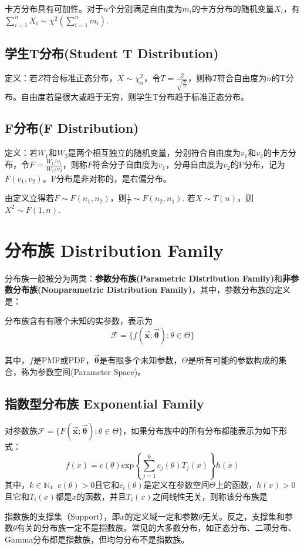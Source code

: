 \documentclass[UTF8]{ctexbook}
\begin{document}
卡方分布具有可加性。对于$n$个分别满足自由度为$m_i$的卡方分布的随机变量$X_i$，有$\sum_{i=1}^nX_i\sim\chi^2(\sum_{i=1}^nm_i)$.
\subsection{学生T分布(Student T Distribution)}
\label{t definition}
定义：若$Z$符合标准正态分布，$X\sim \chi_n^2$，令$T=\frac{Z}{\sqrt{\frac{X}{n}}}$，则称$T$符合自由度为$n$的T分布。自由度若是很大或趋于无穷，则学生T分布趋于标准正态分布。
\subsection{F分布(F Distribution)}
定义：若$W_1$和$W_2$是两个相互独立的随机变量，分别符合自由度为$v_1$和$v_2$的卡方分布，令$F=\frac{W_1/v_1}{W_2/v_2}$，则称$F$符合分子自由度为$v_1$，分母自由度为$v_2$的F分布，记为$F(v_1,v_2)$。F分布是非对称的，是右偏分布。

由定义立得若$F\sim F(n_1,n_2)$，则$\frac{1}{F}\sim F(n_2,n_1)$. 若$X\sim T(n)$，则$X^2\sim F(1,n)$.
\section{分布族 Distribution Family}
分布族一般被分为两类：\textbf{参数分布族(Parametric Distribution Family)}和\textbf{非参数分布族(Nonparametric Distribution Family)}，其中，参数分布族的定义是：

分布族含有有限个未知的实参数，表示为
\[
	\mathcal{F}=\{f(\vec{\boldsymbol x};\vec{\boldsymbol\theta}):\theta\in\Theta\}
\]

其中，$f$是PMF或PDF，$\vec{\boldsymbol\theta}$是有限多个未知参数，$\Theta$是所有可能的参数构成的集合，称为参数空间(Parameter Space)。
\subsection{指数型分布族 Exponential Family}
对参数族$\mathcal{F}=\{F(\vec{\boldsymbol x};\vec{\boldsymbol\theta}):\theta\in\Theta\}$，如果分布族中的所有分布都能表示为如下形式：
\[
	f(x)=c(\theta)\text{exp}\left\{\sum_{j=1}^kc_j(\theta)T_j(x)\right\}h(x)
\]
其中，$k\in\mathbb{N}$，$c(\theta)>0$且它和$c_i(\theta)$是定义在参数空间$\Theta$上的函数，$h(x)>0$且它和$T_i(x)$都是$x$的函数，并且$T_i(x)$之间线性无关，则称该分布族是

指数族的支撑集（Support），即$x$的定义域一定和参数$\theta$无关。反之，支撑集和参数$\theta$有关的分布族一定不是指数族。常见的大多数分布，如正态分布、二项分布、Gamma分布都是指数族，但均匀分布不是指数族。
\end{document}
